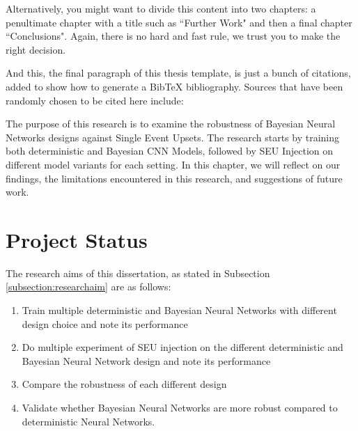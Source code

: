 \documentclass[ %
                    author={Revalda Putawara},
                supervisor={Dr. James Pope},
                    degree={MSc},
                     title={Robustness of Bayesian Neural Networks Design Choices Against Weight and Bias Perturbation Induced by Single Event Upsets (SEUs)},
                      type={},
                      year={2025}]{dissertation}
\begin{document}
Alternatively, you might want to divide this content into two chapters: a penultimate chapter with a title such as ``Further Work" and then a final chapter ``Conclusions". Again, there is no hard and fast rule, we trust you to make the right decision. 

And this, the final paragraph of this thesis template, is just a bunch of citations, added to show how to generate a BibTeX bibliography. Sources that have been randomly chosen to be cited here include:
\fi



The purpose of this research is to examine the robustness of Bayesian Neural Networks designs against Single Event Upsets. The research starts by training both deterministic and Bayesian CNN Models, followed by SEU Injection on different model variants for each setting. In this chapter, we will reflect on our findings, the limitations encountered in this research, and suggestions of future work.


\section{Project Status}

The research aims of this dissertation, as stated in Subsection \ref{subsection:researchaim} are as follows:

\begin{enumerate}
\item Train multiple deterministic and Bayesian Neural Networks with different design choice and note its performance
\item Do multiple experiment of SEU injection on the different deterministic and Bayesian Neural Network design and note its performance
\item Compare the robustness of each different design
\item Validate whether Bayesian Neural Networks are more robust compared to deterministic Neural Networks.
\end{enumerate}
\end{document}
